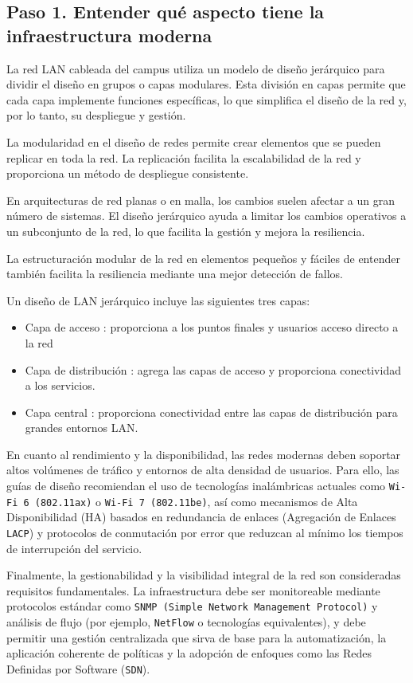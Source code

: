 \subsection*{Paso 1. Entender qué aspecto tiene la infraestructura moderna}
La red LAN cableada del campus utiliza un modelo de diseño jerárquico para dividir el diseño en grupos o capas modulares. Esta división en capas permite que cada capa implemente funciones específicas, lo que simplifica el diseño de la red y, por lo tanto, su despliegue y gestión.

La modularidad en el diseño de redes permite crear elementos que se pueden replicar en toda la red. La replicación facilita la escalabilidad de la red y proporciona un método de despliegue consistente.

En arquitecturas de red planas o en malla, los cambios suelen afectar a un gran número de sistemas. El diseño jerárquico ayuda a limitar los cambios operativos a un subconjunto de la red, lo que facilita la gestión y mejora la resiliencia.

La estructuración modular de la red en elementos pequeños y fáciles de entender también facilita la resiliencia mediante una mejor detección de fallos.

Un diseño de LAN jerárquico incluye las siguientes tres capas:
\begin{itemize}
    \item Capa de acceso : proporciona a los puntos finales y usuarios acceso directo a la red
    \item Capa de distribución : agrega las capas de acceso y proporciona conectividad a los servicios.
    \item Capa central : proporciona conectividad entre las capas de distribución para grandes entornos LAN.
\end{itemize}

\parencite{cisco2024campus}



En cuanto al rendimiento y la disponibilidad, las redes modernas deben soportar altos volúmenes de tráfico y entornos de alta densidad de usuarios. Para ello, las guías de diseño recomiendan el uso de tecnologías inalámbricas actuales como \texttt{Wi-Fi 6 (802.11ax)} o \texttt{Wi-Fi 7 (802.11be)}, así como mecanismos de Alta Disponibilidad (HA) basados en redundancia de enlaces (Agregación de Enlaces \texttt{LACP}) y protocolos de conmutación por error que reduzcan al mínimo los tiempos de interrupción del servicio.

Finalmente, la gestionabilidad y la visibilidad integral de la red son consideradas requisitos fundamentales. La infraestructura debe ser monitoreable mediante protocolos estándar como \texttt{SNMP (Simple Network Management Protocol)} y análisis de flujo (por ejemplo, \texttt{NetFlow} o tecnologías equivalentes), y debe permitir una gestión centralizada que sirva de base para la automatización, la aplicación coherente de políticas y la adopción de enfoques como las Redes Definidas por Software (\texttt{SDN}).